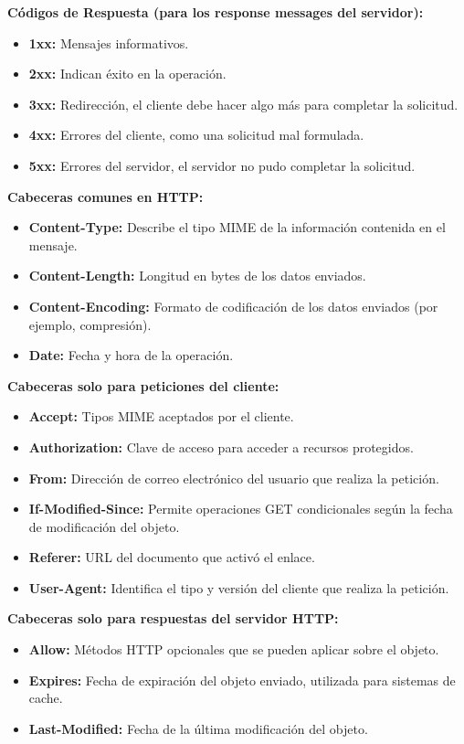\documentclass[a4paper,12pt]{article}
\begin{document}
\textbf{Códigos de Respuesta (para los response messages del servidor):}
\begin{itemize}
    \item \textbf{1xx:} Mensajes informativos.
    \item \textbf{2xx:} Indican éxito en la operación.
    \item \textbf{3xx:} Redirección, el cliente debe hacer algo más para completar la solicitud.
    \item \textbf{4xx:} Errores del cliente, como una solicitud mal formulada.
    \item \textbf{5xx:} Errores del servidor, el servidor no pudo completar la solicitud.
\end{itemize}

\textbf{Cabeceras comunes en HTTP:}
\begin{itemize}
    \item \textbf{Content-Type:} Describe el tipo MIME de la información contenida en el mensaje.
    \item \textbf{Content-Length:} Longitud en bytes de los datos enviados.
    \item \textbf{Content-Encoding:} Formato de codificación de los datos enviados (por ejemplo, compresión).
    \item \textbf{Date:} Fecha y hora de la operación.
\end{itemize}

\textbf{Cabeceras solo para peticiones del cliente:}
\begin{itemize}
    \item \textbf{Accept:} Tipos MIME aceptados por el cliente.
    \item \textbf{Authorization:} Clave de acceso para acceder a recursos protegidos.
    \item \textbf{From:} Dirección de correo electrónico del usuario que realiza la petición.
    \item \textbf{If-Modified-Since:} Permite operaciones GET condicionales según la fecha de modificación del objeto.
    \item \textbf{Referer:} URL del documento que activó el enlace.
    \item \textbf{User-Agent:} Identifica el tipo y versión del cliente que realiza la petición.
\end{itemize}

\textbf{Cabeceras solo para respuestas del servidor HTTP:}
\begin{itemize}
    \item \textbf{Allow:} Métodos HTTP opcionales que se pueden aplicar sobre el objeto.
    \item \textbf{Expires:} Fecha de expiración del objeto enviado, utilizada para sistemas de cache.
    \item \textbf{Last-Modified:} Fecha de la última modificación del objeto.
\end{itemize}
\end{document}
